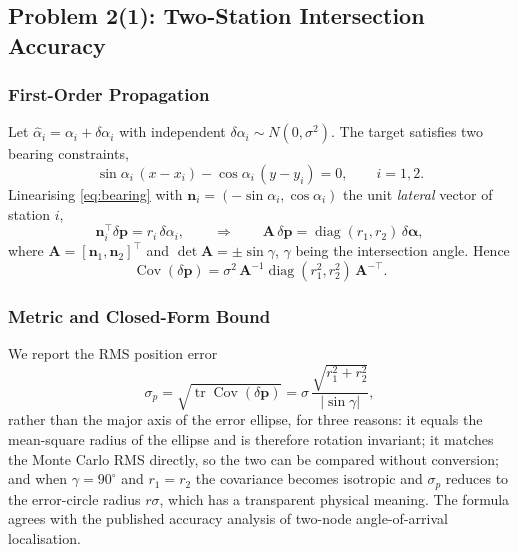 \documentclass[12pt]{article}
\begin{document}
\subsection{Problem 2(1): Two-Station Intersection Accuracy}

\subsubsection{First-Order Propagation}

Let $\hat\alpha_i=\alpha_i+\delta\alpha_i$ with independent $\delta\alpha_i\sim N(0,\sigma^2)$. The target satisfies two bearing constraints,
\begin{equation}
\label{eq:bearing}
\sin\alpha_i\,(x-x_i)-\cos\alpha_i\,(y-y_i)=0,\qquad i=1,2 .
\end{equation}
Linearising \eqref{eq:bearing} with $\bm n_i=(-\sin\alpha_i,\cos\alpha_i)$ the unit \emph{lateral} vector of station $i$,
\begin{equation}
\label{eq:lin}
\bm n_i^{\top}\delta\bm p=r_i\,\delta\alpha_i ,
\qquad\Longrightarrow\qquad
\bm A\,\delta\bm p=\operatorname{diag}(r_1,r_2)\,\delta\bm\alpha ,
\end{equation}
where $\bm A=[\bm n_1,\bm n_2]^{\top}$ and $\det\bm A=\pm\sin\gamma$, $\gamma$ being the intersection angle. Hence
\begin{equation}
\label{eq:cov}
\operatorname{Cov}(\delta\bm p)=\sigma^2\,\bm A^{-1}\operatorname{diag}(r_1^2,r_2^2)\,\bm A^{-\top}.
\end{equation}

\subsubsection{Metric and Closed-Form Bound}

We report the RMS position error
\begin{equation}
\label{eq:sigmap}
\sigma_p=\sqrt{\operatorname{tr}\operatorname{Cov}(\delta\bm p)}
=\sigma\,\frac{\sqrt{r_1^2+r_2^2}}{|\sin\gamma|},
\end{equation}
rather than the major axis of the error ellipse, for three reasons: it equals the mean-square radius of the ellipse and is therefore rotation invariant; it matches the Monte Carlo RMS directly, so the two can be compared without conversion; and when $\gamma=90^\circ$ and $r_1=r_2$ the covariance becomes isotropic and $\sigma_p$ reduces to the error-circle radius $r\sigma$, which has a transparent physical meaning. The formula agrees with the published accuracy analysis of two-node angle-of-arrival localisation\cite{he2015aoa}.
\end{document}
